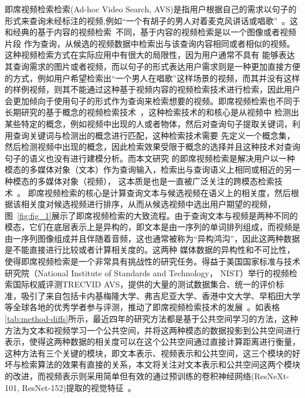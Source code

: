 即席视频检索检索(Ad-hoc Video Search, AVS)是指用户根据自己的需求以句子的形式来查询未经标注的视频,例如“一个有胡子的男人对着麦克风讲话或唱歌”~\cite{awad2016trecvid}。这和经典的基于内容的视频检索~\cite{yu2015content}不同，基于内容的视频检索是以一个图像或者视频片段
作为查询，从候选的视频数据中检索出与该查询内容相同或者相似的视频。这种视频检索方式在实际应用中有很大的局限性，因为用户通常不具有
能够表达其查询需求的图片或者视频，而以句子的形式表达用户需求则是一种更加直接方便的方式，例如用户希望检索出“一个男人在唱歌”这样场景的视频，而其并没有这样的样例视频，则其不能通过这种基于视频内容的视频检索技术进行检索，因此用户会更加倾向于使用句子的形式作为查询来检索想要的视频。即席视频检索也不同于长期研究的基于概念的视频检索技术~\cite{snoekcees2009concept}，这种检索技术的和核心是从视频中
检测出某些特定的概念，例如视频中出现的人或者物体，然后对查询句子提取关键词，利用查询关键词与检测出的概念进行匹配，这种检索技术需要
先定义一个概念集，然后检测视频中出现的概念，因此检索效果受限于概念的选择并且这种技术对查询句子的语义也没有进行建模分析。而本文研究
的即席视频检索是解决用户以一种模态的多媒体对象（文本）作为查询输入，检索出与查询语义上相同或相近的另一种模态的多媒体对象（视频），
这本质是也是一直被广泛关注的跨模态检索技术~\cite{rasiwasia2010a,feng2014cross,pereira2014on,suris2018cross,mithun2018learning}。
即席视频检索的核心是计算查询文本与候选视频在语义上的相关度，然后根据该相关度对候选视频进行排序，从而从候选视频中选出用户期望的视频，图~\ref{fig:fig_1}展示了即席视频检索的大致流程。由于查询文本与视频是两种不同的模态，它们在底层表示上是异构的，即文本是由一序列的单词排列组成，而视频是由一序列图像组成并且伴随着音频，这也通常被称为“异构鸿沟”，因此这两种数据是不能直接进行比较或者计算相关度的。这两种
媒体数据的异构性和不可比性，使得即席视频检索是一个非常具有挑战性的研究任务。得益于美国国家标准与技术研究院（National Institute of Standards and Technology， NIST）举行的视频检索国际权威评测TRECVID AVS，提供的大量的测试数据集合、统一的评价标准，吸引了来自包括卡内基梅隆大学、弗吉尼亚大学、香港中文大学、早稻田大学等全球各地的优秀学者参与评测，推动了即席视频检索技术的发展~\cite{awad2016trecvid,awad2017trecvid,awad2018trecvid,awad2019trecvid}。如表格\ref{tab:method-diffs}所示，最近四年的研究方法都是基于公共空间学习的方法，这种方法为文本和视频学习一个公共空间，并将这两种模态的数据投影到公共空间进行表示，使得这两种数据的相关度可以在这个公共空间通过直接计算距离进行衡量，
这种方法有三个关键的模块，即文本表示、视频表示和公共空间，这三个模块的好坏与检索算法的效果有直接的关系，本文将关注对文本表示和公共空间这两个模块的改进，而视频表示则采用简单但有效的通过预训练的卷积神经网络(ResNeXt-101, ResNet-152)提取的视觉特征~\cite{li2018renmin,li2019renmin}。


